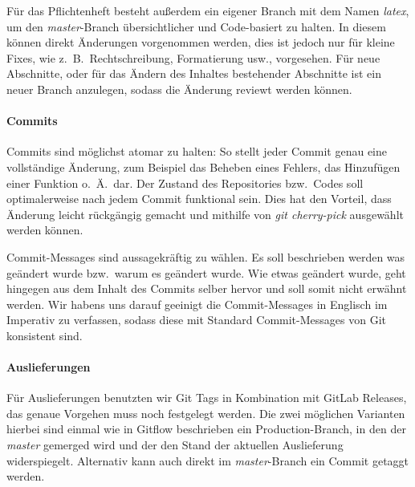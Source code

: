 Für das Pflichtenheft besteht außerdem ein eigener Branch mit dem Namen \textit{latex}, um den
\textit{master}-Branch übersichtlicher und Code-basiert zu halten.
In diesem können direkt Änderungen vorgenommen werden, dies ist jedoch nur für kleine Fixes, wie
z.\ B.\ Rechtschreibung, Formatierung usw., vorgesehen.
Für neue Abschnitte, oder für das Ändern des Inhaltes bestehender Abschnitte ist ein neuer Branch
anzulegen, sodass die Änderung reviewt werden können.

\paragraph{Commits}
Commits sind möglichst atomar zu halten:
So stellt jeder Commit genau eine vollständige Änderung, zum Beispiel das Beheben eines
Fehlers, das Hinzufügen einer Funktion o.\ Ä.\ dar.
Der Zustand des Repositories bzw.\ Codes soll optimalerweise nach jedem Commit funktional sein.
Dies hat den Vorteil, dass Änderung leicht rückgängig gemacht und mithilfe von
\textit{git cherry-pick} ausgewählt werden können.

Commit-Messages sind aussagekräftig zu wählen.
Es soll beschrieben werden was geändert wurde bzw.\ warum es geändert wurde.
Wie etwas geändert wurde, geht hingegen aus dem Inhalt des Commits selber hervor und soll somit
nicht erwähnt werden.
Wir habens uns darauf geeinigt die Commit-Messages in Englisch im Imperativ zu verfassen, sodass
diese mit Standard Commit-Messages von Git konsistent sind.

\paragraph{Auslieferungen}\label{subsec:auslieferungen}
Für Auslieferungen benutzten wir Git Tags in Kombination mit GitLab Releases, das genaue Vorgehen
muss noch festgelegt werden.
Die zwei möglichen Varianten hierbei sind einmal wie in Gitflow beschrieben ein
Production-Branch, in den der \textit{master} gemerged wird und der den Stand der aktuellen Auslieferung
widerspiegelt.
Alternativ kann auch direkt im \textit{master}-Branch ein Commit getaggt werden.
